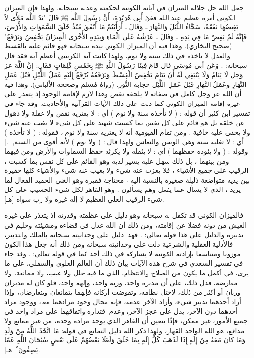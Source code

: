 جعل الله جل جلاله الميزان في آياته الكونية لحكمته وعدله سبحانه. ولهذا فإن الميزان الكوني أمره عظيم عند الله فعَنْ أَبِي هُرَيْرَةَ، أَنَّ رَسُولَ اللَّهِ ﷺ قَالَ "يَدُ اللَّهِ مَلأَى لاَ يَغِيضُهَا نَفَقَةٌ، سَحَّاءُ اللَّيْلَ وَالنَّهَارَ ـ وَقَالَ ـ أَرَأَيْتُمْ مَا أَنْفَقَ مُنْذُ خَلَقَ السَّمَوَاتِ وَالأَرْضَ، فَإِنَّهُ لَمْ يَغِضْ مَا فِي يَدِهِ ـ وَقَالَ ـ عَرْشُهُ عَلَى الْمَاءِ وَبِيَدِهِ الأُخْرَى الْمِيزَانُ يَخْفِضُ وَيَرْفَعُ" {\footnotesize (صحيح البخاري)}. وهذا فيه أن الميزان الكوني بيده سبحانه فهو قائم عليه بالقسط والعدل لا تأخذه في ذلك سنة ولا نوم، ولهذا كانت آية الكرسي أعظم آية فقد قال سبحانه:
\quranayah*[2][255][1-12]{\footnotesize \surahname*[2]}. وَعَن أبي مُوسَى قَالَ قَامَ فِينَا رَسُولُ اللَّهِ ﷺ بِخَمْسِ كَلِمَاتٍ فَقَالَ: إِنَّ اللَّهَ عز وَجل لَا يَنَامُ وَلَا يَنْبَغِي لَهُ أَنْ يَنَامَ يَخْفِضُ الْقِسْطَ وَيَرْفَعُهُ يُرْفَعُ إِلَيْهِ عَمَلُ اللَّيْلِ قَبْلَ عَمَلِ النَّهَارِ وَعَمَلُ النَّهَارِ قَبْلَ عَمَلِ اللَّيْل حجابه النُّور. {\footnotesize (رَوَاهُ مُسلم وصححه الألباني)}. وهذا فيه أن الله عز وجل كامل في صفاته لا يلحقه نقص وهذا لازم لإقامة الوجود إذ يتعذر على غيره إقامة الميزان الكوني كما دلت على ذلك الآيات القرآنية والأحاديث. وقد جاء في تفسير ابن كثير أن قوله : ( لا تأخذه سنة ولا نوم ) أي : لا يعتريه نقص ولا غفلة ولا ذهول عن خلقه بل هو قائم على كل نفس بما كسبت شهيد على كل شيء لا يغيب عنه شيء ولا يخفى عليه خافية ، ومن تمام القيومية أنه لا يعتريه سنة ولا نوم ، فقوله : ( لا تأخذه ) أي : لا تغلبه سنة وهي الوسن والنعاس ولهذا قال : ( ولا نوم ) لأنه أقوى من السنة, [.] وقوله : ( ولا يئوده حفظهما ) أي : لا يثقله ولا يكرثه حفظ السماوات والأرض ومن فيهما ومن بينهما ، بل ذلك سهل عليه يسير لديه وهو القائم على كل نفس بما كسبت ، الرقيب على جميع الأشياء ، فلا يعزب عنه شيء ولا يغيب عنه شيء والأشياء كلها حقيرة بين يديه متواضعة ذليلة صغيرة بالنسبة إليه ، محتاجة فقيرة وهو الغني الحميد الفعال لما يريد ، الذي لا يسأل عما يفعل وهم يسألون . وهو القاهر لكل شيء الحسيب على كل شيء الرقيب العلي العظيم لا إله غيره ولا رب سواه [هـ].

فالميزان الكوني قد تكفل به سبحانه وهو دليل على عظمته وقدرته إذ يتعذر على غيره العيش من دونه فضلا عن إقامته، ومن ذلك أن الله عدل في قضاءه ومشيئته وحليم في تدبيره والدليل على هذا قوله تعالى:
\quranayah*[35][41]{\footnotesize \surahname*[35]}. فهذا دليل على وحدانيته سبحانه بالملك والتدبير، فالأدلية العقلية والشرعية دلت على وحدانيته سبحانه ومن ذلك أنه جعل هذا الكون موزونا ومتناسقا بإرادته الكونية لا يشاركه في ذلك أحد كما في قوله تعالى:
\quranayah*[21][22]{\footnotesize \surahname*[21]}. وقد جاء في تفسير السعدي في شرح هذه الآيات بيان ذلك أن العالم العلوي والسفلي، على ما يرى، في أكمل ما يكون من الصلاح والانتظام، الذي ما فيه خلل ولا عيب، ولا ممانعة، ولا معارضة، فدل ذلك، على أن مدبره واحد، وربه واحد، وإلهه واحد، فلو كان له مدبران وربان أو أكثر من ذلك، لاختل نظامه، وتقوضت أركانه فإنهما يتمانعان ويتعارضان، وإذا أراد أحدهما تدبير شيء، وأراد الآخر عدمه، فإنه محال وجود مرادهما معا، ووجود مراد أحدهما دون الآخر، يدل على عجز الآخر، وعدم اقتداره واتفاقهما على مراد واحد في جميع الأمور، غير ممكن، فإذًا يتعين أن القاهر الذي يوجد مراده وحده، من غير ممانع ولا مدافع، هو الله الواحد القهار، ولهذا ذكر الله دليل التمانع في قوله: { مَا اتَّخَذَ اللَّهُ مِنْ وَلَدٍ وَمَا كَانَ مَعَهُ مِنْ إِلَهٍ إِذًا لَذَهَبَ كُلُّ إِلَهٍ بِمَا خَلَقَ وَلَعَلَا بَعْضُهُمْ عَلَى بَعْضٍ سُبْحَانَ اللَّهِ عَمَّا يَصِفُونَ ْ} [هـ].


